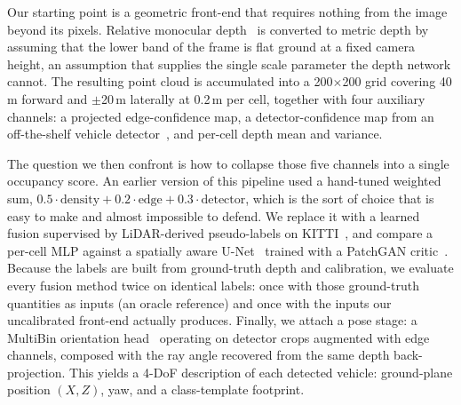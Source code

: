 \documentclass[sigconf]{acmart}
\newcommand{\rev}[1]{{\color{revcolor}#1}}
\begin{document}
Our starting point is a geometric front-end that requires nothing from the image beyond its pixels. Relative monocular depth~\cite{ranftl2022midas} is converted to metric depth by assuming that the lower band of the frame is flat ground at a fixed camera height, an assumption that supplies the single scale parameter the depth network cannot. The resulting point cloud is accumulated into a 200$\times$200 grid covering 40\,m forward and $\pm$20\,m laterally at 0.2\,m per cell, together with four auxiliary channels: a projected edge-confidence map, a detector-confidence map from an off-the-shelf vehicle detector~\cite{jocher2023yolov8}, and per-cell depth mean and variance.

The question we then confront is how to collapse those five channels into a single occupancy score. An earlier version of this pipeline used a hand-tuned weighted sum, $0.5\cdot\text{density} + 0.2\cdot\text{edge} + 0.3\cdot\text{detector}$, which is the sort of choice that is easy to make and almost impossible to defend. We replace it with a learned fusion supervised by LiDAR-derived pseudo-labels on KITTI~\cite{geiger2012kitti,uhrig2017sparsity}, and compare a per-cell MLP against a spatially aware U-Net~\cite{ronneberger2015unet} trained with a PatchGAN critic~\cite{isola2017pix2pix}. \rev{Because the labels are built from ground-truth depth and calibration, we evaluate every fusion method twice on identical labels: once with those ground-truth quantities as inputs (an oracle reference) and once with the inputs our uncalibrated front-end actually produces.} Finally, we attach a pose stage: a MultiBin orientation head~\cite{mousavian2017multibin} operating on detector crops augmented with edge channels, composed with the ray angle recovered from the same depth back-projection. This yields a 4-DoF description of each detected vehicle: ground-plane position $(X,Z)$, yaw, and a class-template footprint.
\end{document}
